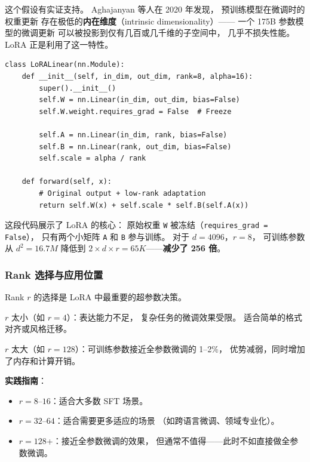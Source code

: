 这个假设有实证支持。
Aghajanyan 等人在 2020 年发现，
预训练模型在微调时的权重更新
存在极低的\textbf{内在维度}（intrinsic dimensionality）——
一个 175B 参数模型的微调更新
可以被投影到仅有几百或几千维的子空间中，
几乎不损失性能。
LoRA 正是利用了这一特性。


\begin{lstlisting}[caption={LoRA implementation concept}]
class LoRALinear(nn.Module):
    def __init__(self, in_dim, out_dim, rank=8, alpha=16):
        super().__init__()
        self.W = nn.Linear(in_dim, out_dim, bias=False)
        self.W.weight.requires_grad = False  # Freeze

        self.A = nn.Linear(in_dim, rank, bias=False)
        self.B = nn.Linear(rank, out_dim, bias=False)
        self.scale = alpha / rank

    def forward(self, x):
        # Original output + low-rank adaptation
        return self.W(x) + self.scale * self.B(self.A(x))
\end{lstlisting}

这段代码展示了 LoRA 的核心：
原始权重 \texttt{W} 被冻结（\texttt{requires\_grad = False}），
只有两个小矩阵 \texttt{A} 和 \texttt{B} 参与训练。
对于 $d = 4096$，$r = 8$，
可训练参数从 $d^2 = 16.7M$ 降低到
$2 \times d \times r = 65K$——\textbf{减少了 256 倍}。

\subsubsection{Rank 选择与应用位置}

Rank $r$ 的选择是 LoRA 中最重要的超参数决策。

$r$ 太小（如 $r = 4$）：表达能力不足，
复杂任务的微调效果受限。
适合简单的格式对齐或风格迁移。

$r$ 太大（如 $r = 128$）：可训练参数接近全参数微调的 1--2\%，
优势减弱，同时增加了内存和计算开销。

\textbf{实践指南}：
\begin{itemize}[noitemsep]
  \item $r = 8$--$16$：适合大多数 SFT 场景。
  \item $r = 32$--$64$：适合需要更多适应的场景
       （如跨语言微调、领域专业化）。
  \item $r = 128$+：接近全参数微调的效果，
        但通常不值得——此时不如直接做全参数微调。
\end{itemize}

